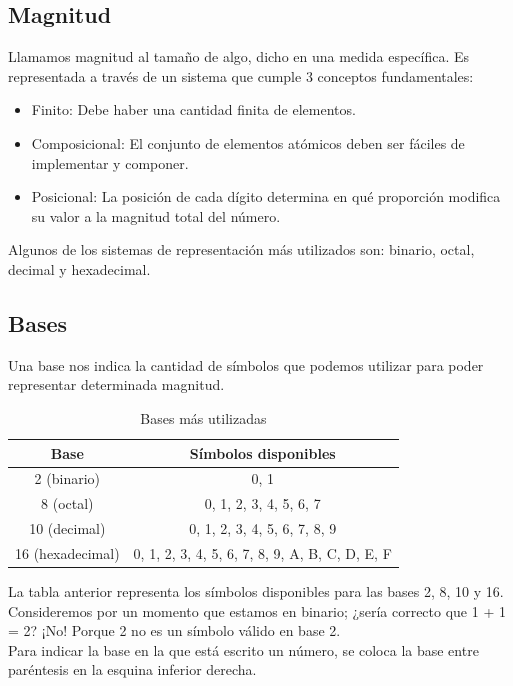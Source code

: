 \documentclass[10pt,a4paper]{article}
\begin{document}
\subsection*{Magnitud}
Llamamos magnitud al tamaño de algo, dicho en una medida específica. 
Es representada a través de un sistema que cumple 3 conceptos fundamentales: 
\begin{itemize}
    \item Finito: Debe haber una cantidad finita de elementos.
    \item Composicional: El conjunto de elementos atómicos deben ser fáciles de implementar y componer.
    \item Posicional: La posición de cada dígito determina en qué proporción modifica su valor a la magnitud total del número.
  \end{itemize}
Algunos de los sistemas de representación más utilizados son: binario, octal, decimal y hexadecimal.

\subsection*{Bases}
Una base nos indica la cantidad de símbolos que podemos utilizar para poder representar determinada magnitud.
\begin{table}[h!]
    \centering
    \begin{tabular}{|c | c|}
    \hline
    \textbf{Base} & \textbf{Símbolos disponibles}  \\[0.1cm]
    \hline\hline
    2 (binario) & 0, 1 \\
    8 (octal) & 0, 1, 2, 3, 4, 5, 6, 7 \\
    10 (decimal) & 0, 1, 2, 3, 4, 5, 6, 7, 8, 9 \\
    16 (hexadecimal) & 0, 1, 2, 3, 4, 5, 6, 7, 8, 9, A, B, C, D, E, F \\
    \hline
    \end{tabular}
    \caption{Bases más utilizadas}
    \label{tab:bases}
\end{table}

La tabla anterior representa los símbolos disponibles para las bases 2, 8, 10 y 16.\\


Consideremos por un momento que estamos en binario; ¿sería correcto que 1 + 1 = 2? ¡No! Porque 2 no es un símbolo válido en base 2.\\

Para indicar la base en la que está escrito un número, se coloca la base entre paréntesis en la esquina inferior derecha.\\
\end{document}

